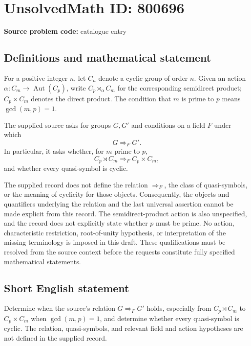 \documentclass[11pt]{article}
\begin{document}
\section*{UnsolvedMath ID: 800696}
\textbf{Source problem code:} catalogue entry
\subsection{Definitions and mathematical statement}
For a positive integer \(n\), let \(C_n\) denote a cyclic group of order \(n\). Given an action \(\alpha\colon C_m\to\operatorname{Aut}(C_p)\), write \(C_p\rtimes_{\alpha}C_m\) for the corresponding semidirect product; \(C_p\times C_m\) denotes the direct product. The condition that \(m\) is prime to \(p\) means \(\gcd(m,p)=1\).

The supplied source asks for groups \(G,G'\) and conditions on a field \(F\) under which
\[
G\Rightarrow_F G'.
\]
In particular, it asks whether, for \(m\) prime to \(p\),
\[
C_p\rtimes C_m\Rightarrow_F C_p\times C_m,
\]
and whether every quasi-symbol is cyclic.

The supplied record does not define the relation \(\Rightarrow_F\), the class of quasi-symbols, or the meaning of cyclicity for those objects. Consequently, the objects and quantifiers underlying the relation and the last universal assertion cannot be made explicit from this record. The semidirect-product action is also unspecified, and the record does not explicitly state whether \(p\) must be prime. No action, characteristic restriction, root-of-unity hypothesis, or interpretation of the missing terminology is imposed in this draft. These qualifications must be resolved from the source context before the requests constitute fully specified mathematical statements.
\subsection{Short English statement}
Determine when the source's relation \(G\Rightarrow_F G'\) holds, especially from \(C_p\rtimes C_m\) to \(C_p\times C_m\) when \(\gcd(m,p)=1\), and determine whether every quasi-symbol is cyclic. The relation, quasi-symbols, and relevant field and action hypotheses are not defined in the supplied record.
\end{document}
